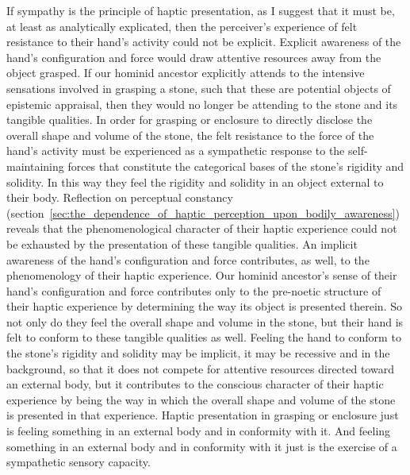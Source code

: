If sympathy is the principle of haptic presentation, as I suggest that it must be, at least as analytically explicated, then the perceiver's experience of felt resistance to their hand's activity could not be explicit. Explicit awareness of the hand's configuration and force would draw attentive resources away from the object grasped. If our hominid ancestor explicitly attends to the intensive sensations involved in grasping a stone, such that these are potential objects of epistemic appraisal, then they would no longer be attending to the stone and its tangible qualities. In order for grasping or enclosure to directly disclose the overall shape and volume of the stone, the felt resistance to the force of the hand's activity must be experienced as a sympathetic response to the self-maintaining forces that constitute the categorical bases of the stone's rigidity and solidity. In this way they feel the rigidity and solidity in an object external to their body. Reflection on perceptual constancy (section~\ref{sec:the_dependence_of_haptic_perception_upon_bodily_awareness}) reveals that the phenomenological character of their haptic experience could not be exhausted by the presentation of these tangible qualities. An implicit awareness of the hand's configuration and force contributes, as well, to the phenomenology of their haptic experience. Our hominid ancestor's sense of their hand’s configuration and force contributes only to the pre-noetic structure of their haptic experience by determining the way its object is presented therein. So not only do they feel the overall shape and volume in the stone, but their hand is felt to conform to these tangible qualities as well. Feeling the hand to conform to the stone's rigidity and solidity may be implicit, it may be recessive and in the background, so that it does not compete for attentive resources directed toward an external body, but it contributes to the conscious character of their haptic experience by being the way in which the overall shape and volume of the stone is presented in that experience. Haptic presentation in grasping or enclosure just is feeling something in an external body and in conformity with it. And feeling something in an external body and in conformity with it just is the exercise of a sympathetic sensory capacity.



